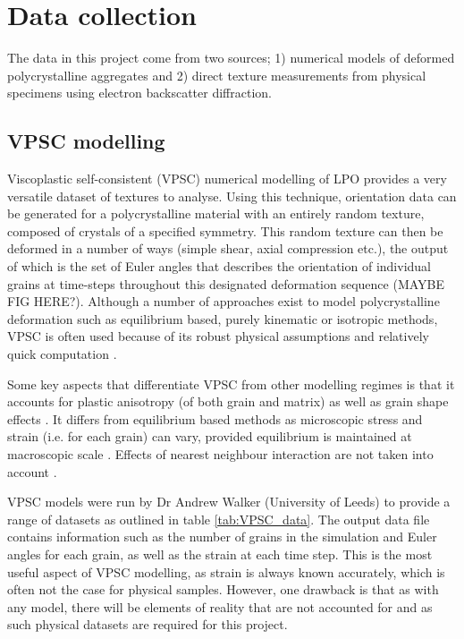 \documentclass[a4paper,12pt]{report}
\numberwithin{equation}{chapter}
\begin{document}
\section{Data collection} \label{sec:data}
The data in this project come from two sources; 1) numerical models of deformed polycrystalline aggregates and 2) direct texture measurements from physical specimens using electron backscatter diffraction. 

\subsection{VPSC modelling}
Viscoplastic self-consistent (VPSC) numerical modelling of LPO \citep{Molinari1987,Lebensohn1993} provides a very versatile dataset of textures to analyse. Using this technique, orientation data can be generated for a polycrystalline material with an entirely random texture, composed of crystals of a specified symmetry. This random texture can then be deformed in a number of ways (simple shear, axial compression etc.), the output of which is the set of Euler angles that describes the orientation of individual grains at time-steps throughout this designated deformation sequence (MAYBE FIG HERE?). Although a number of approaches exist to model polycrystalline deformation such as equilibrium based, purely kinematic or isotropic methods, VPSC is often used because of its robust physical assumptions and relatively quick computation \citep[][and references therein]{Tommasi2000}. 

Some key aspects that differentiate VPSC from other modelling regimes is that it accounts for plastic anisotropy (of both grain and matrix) as well as grain shape effects \citep[as introduced by][]{Lebensohn1993}. It differs from equilibrium based methods as microscopic stress and strain (i.e. for each grain) can vary, provided equilibrium is maintained at macroscopic scale \citep{Tommasi2000}. Effects of nearest neighbour interaction are not taken into account \citep[see][for details]{Castelnau1996}.

VPSC models were run by Dr Andrew Walker (University of Leeds) to provide a range of datasets as outlined in table \ref{tab:VPSC_data}. The output data file contains information such as the number of grains in the simulation and Euler angles for each grain, as well as the strain at each time step. This is the most useful aspect of VPSC modelling, as strain is always known accurately, which is often not the case for physical samples. However, one drawback is that as with any model, there will be elements of reality that are not accounted for and as such physical datasets are required for this project.
\end{document}

